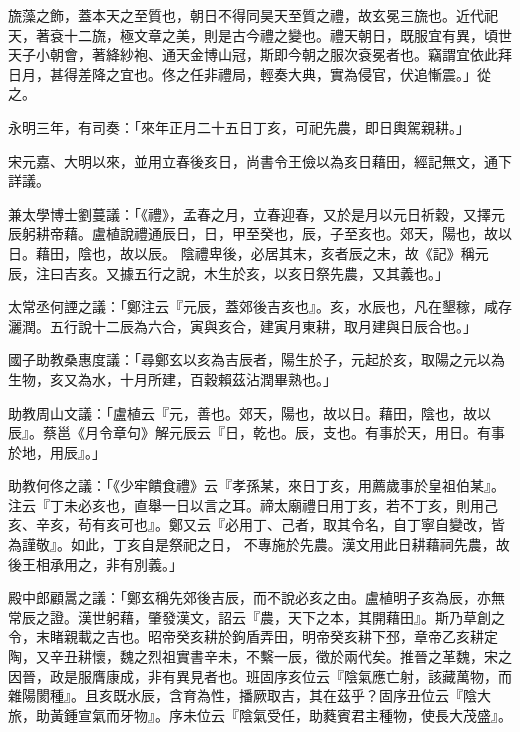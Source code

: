 \begin{pinyinscope}
 旒藻之飾，蓋本天之至質也，朝日不得同昊天至質之禮，故玄冕三旒也。近代祀天，著袞十二旒，極文章之美，則是古今禮之變也。禮天朝日，既服宜有異，頃世天子小朝會，著絳紗袍、通天金博山冠，斯即今朝之服次袞冕者也。竊謂宜依此拜日月，甚得差降之宜也。佟之任非禮局，輕奏大典，實為侵官，伏追慚震。」從之。



 永明三年，有司奏：「來年正月二十五日丁亥，可祀先農，即日輿駕親耕。」



 宋元嘉、大明以來，並用立春後亥日，尚書令王儉以為亥日藉田，經記無文，通下詳議。



 兼太學博士劉蔓議：「《禮》，孟春之月，立春迎春，又於是月以元日祈穀，又擇元辰躬耕帝藉。盧植說禮通辰日，日，甲至癸也，辰，子至亥也。郊天，陽也，故以日。藉田，陰也，故以辰。
 陰禮卑後，必居其末，亥者辰之末，故《記》稱元辰，注曰吉亥。又據五行之說，木生於亥，以亥日祭先農，又其義也。」



 太常丞何諲之議：「鄭注云『元辰，蓋郊後吉亥也』。亥，水辰也，凡在墾稼，咸存灑潤。五行說十二辰為六合，寅與亥合，建寅月東耕，取月建與日辰合也。」



 國子助教桑惠度議：「尋鄭玄以亥為吉辰者，陽生於子，元起於亥，取陽之元以為生物，亥又為水，十月所建，百穀賴茲沾潤畢熟也。」



 助教周山文議：「盧植云『元，善也。郊天，陽也，故以日。藉田，陰也，故以辰』。蔡邕《月令章句》解元辰云『日，乾也。辰，支也。有事於天，用日。有事於地，用辰』。」



 助教何佟之議：「《少牢饋食禮》云『孝孫某，來日丁亥，用薦歲事於皇祖伯某』。注云『丁未必亥也，直舉一日以言之耳。禘太廟禮日用丁亥，若不丁亥，則用己亥、辛亥，茍有亥可也』。鄭又云『必用丁、己者，取其令名，自丁寧自變改，皆為謹敬』。如此，丁亥自是祭祀之日，
 不專施於先農。漢文用此日耕藉祠先農，故後王相承用之，非有別義。」



 殿中郎顧暠之議：「鄭玄稱先郊後吉辰，而不說必亥之由。盧植明子亥為辰，亦無常辰之證。漢世躬藉，肇發漢文，詔云『農，天下之本，其開藉田』。斯乃草創之令，末睹親載之吉也。昭帝癸亥耕於鉤盾弄田，明帝癸亥耕下邳，章帝乙亥耕定陶，又辛丑耕懷，魏之烈祖實書辛未，不繫一辰，徵於兩代矣。推晉之革魏，宋之因晉，政是服膺康成，非有異見者也。班固序亥位云『陰氣應亡射，該藏萬物，而雜陽閡種』。且亥既水辰，含育為性，播厥取吉，其在茲乎？固序丑位云『陰大旅，助黃鍾宣氣而牙物』。序未位云『陰氣受任，助蕤賓君主種物，使長大茂盛』。




\end{pinyinscope}
